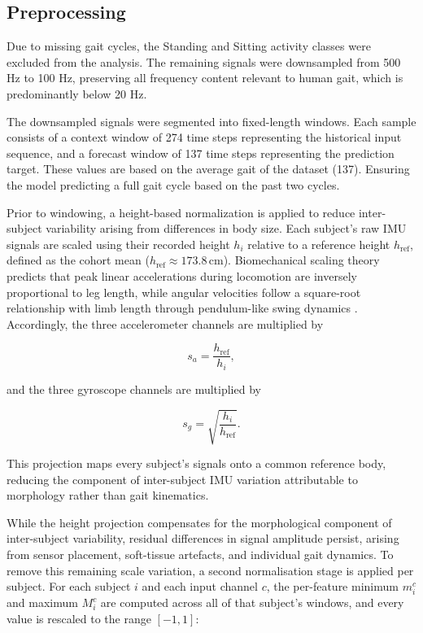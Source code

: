 \subsection{Preprocessing}
Due to missing gait cycles, the Standing and Sitting activity classes were excluded from 
the analysis. The remaining signals were downsampled from 500 Hz to 100 Hz, preserving 
all frequency content relevant to human gait, which is predominantly below 20 Hz.

The downsampled signals were segmented into fixed-length windows. Each sample consists 
of a context window of 274 time steps representing the historical input sequence, and a 
forecast window of 137 time steps representing the prediction target. These values are based on the average gait of the dataset (137). Ensuring the model predicting a full gait cycle based on the past two cycles.

Prior to windowing, a height-based normalization is applied to reduce inter-subject
variability arising from differences in body size. Each subject's raw IMU signals are
scaled using their recorded height $h_i$ relative to a reference height $h_\text{ref}$,
defined as the cohort mean ($h_\text{ref} \approx 173.8$\,cm).
Biomechanical scaling theory predicts that peak linear accelerations during locomotion
are inversely proportional to leg length, while angular velocities follow a square-root
relationship with limb length through pendulum-like swing dynamics \cite{PLACEHOLDER}.
Accordingly, the three accelerometer channels are multiplied by

\begin{equation}
    s_a = \frac{h_\text{ref}}{h_i},
    \label{eq:accel_scale}
\end{equation}

\noindent and the three gyroscope channels are multiplied by

\begin{equation}
    s_g = \sqrt{\frac{h_i}{h_\text{ref}}}.
    \label{eq:gyro_scale}
\end{equation}

\noindent This projection maps every subject's signals onto a common reference body,
reducing the component of inter-subject IMU variation attributable to morphology rather
than gait kinematics.

\noindent While the height projection compensates for the morphological component
of inter-subject variability, residual differences in signal amplitude persist,
arising from sensor placement, soft-tissue artefacts, and individual gait dynamics.
To remove this remaining scale variation, a second normalisation stage is applied
per subject. For each subject $i$ and each input channel $c$, the per-feature
minimum $m_i^c$ and maximum $M_i^c$ are computed across all of that subject's
windows, and every value is rescaled to the range $[-1, 1]$:

